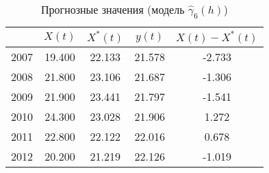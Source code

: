 \begin{table}[H]
\centering
\begin{tabular}{r|cccc}
  \hline
 & $X(t)$ & $X^{*}(t)$ & $y(t)$ & $ X(t) - X^{*}(t) $ \\ 
  \hline
2007 & 19.400 & 22.133 & 21.578 & -2.733 \\ 
  2008 & 21.800 & 23.106 & 21.687 & -1.306 \\ 
  2009 & 21.900 & 23.441 & 21.797 & -1.541 \\ 
  2010 & 24.300 & 23.028 & 21.906 & 1.272 \\ 
  2011 & 22.800 & 22.122 & 22.016 & 0.678 \\ 
  2012 & 20.200 & 21.219 & 22.126 & -1.019 \\ 
   \hline
\end{tabular}
\caption{Прогнозные значения (модель $ \widehat{\gamma}_6(h) $)} 
\label{table:per-fit-cv-prediction}
\end{table}
